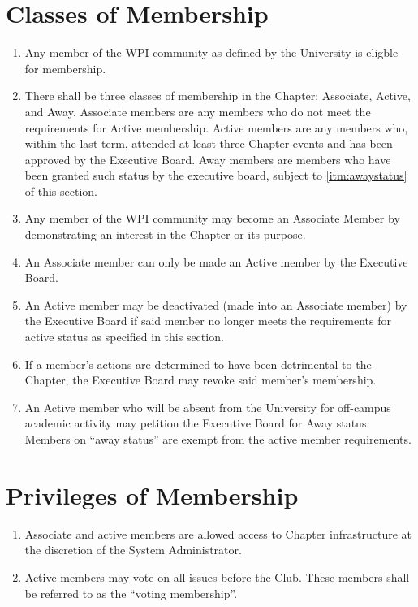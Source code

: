 \documentclass[12pt, letterpaper, oneside]{book}
\begin{document}
\section{Classes of Membership} \label{sec:memberclasses}
\begin{enumerate}
    \item Any member of the WPI community as defined by the University is
        eligble for membership.
    \item \label{itm:memberclasses} There shall be three classes of membership in the Chapter: Associate,
        Active, and Away.
        \subitem Associate members are any members who do not meet the
        requirements for Active membership.
        \subitem Active members are any members who, within the last
        term, attended at least three Chapter events and has been
        approved by the Executive Board.
        \subitem Away members are members who have been granted such status by
        the executive board, subject to \cref{itm:awaystatus} of this section.
    \item \label{itm:associate} Any member of the WPI community may become an
        Associate Member by demonstrating an interest in the Chapter or its
        purpose.
    \item \label{itm:activation} An Associate member can only be made an Active
        member by the Executive Board.
    \item \label{itm:deactivation} An Active member may be deactivated (made
        into an Associate member) by the Executive Board if said member no
        longer meets the requirements for active status as specified in this
        section.
    \item \label{itm:expulsion} If a member's actions are determined to have
        been detrimental to the Chapter, the Executive Board may revoke said
        member's membership.
    \item \label{itm:awaystatus} An Active member who will be absent from the
        University for off-campus academic activity may petition the Executive
        Board for Away status. Members on ``away status'' are exempt from the
        active member requirements.
\end{enumerate}

\section{Privileges of Membership}
\begin{enumerate}
    \item Associate and active members are allowed access to Chapter
        infrastructure at the discretion of the System Administrator.
    \item Active members may vote on all issues before the Club. These members
        shall be referred to as the ``voting membership''.
\end{enumerate}
\end{document}
